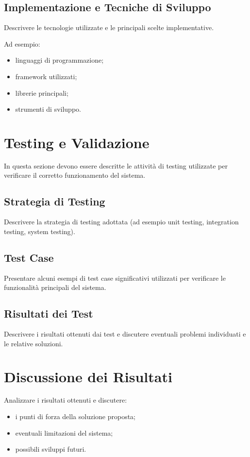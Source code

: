 \subsection{Implementazione e Tecniche di Sviluppo}

Descrivere le tecnologie utilizzate e le principali scelte implementative.

Ad esempio:

\begin{itemize}
\item linguaggi di programmazione;
\item framework utilizzati;
\item librerie principali;
\item strumenti di sviluppo.
\end{itemize}

\section{Testing e Validazione}

In questa sezione devono essere descritte le attività di testing
utilizzate per verificare il corretto funzionamento del sistema.

\subsection{Strategia di Testing}

Descrivere la strategia di testing adottata (ad esempio unit testing,
integration testing, system testing).

\subsection{Test Case}

Presentare alcuni esempi di test case significativi utilizzati
per verificare le funzionalità principali del sistema.

\subsection{Risultati dei Test}

Descrivere i risultati ottenuti dai test e discutere eventuali
problemi individuati e le relative soluzioni.

\section{Discussione dei Risultati}

Analizzare i risultati ottenuti e discutere:

\begin{itemize}
\item i punti di forza della soluzione proposta;
\item eventuali limitazioni del sistema;
\item possibili sviluppi futuri.
\end{itemize}
